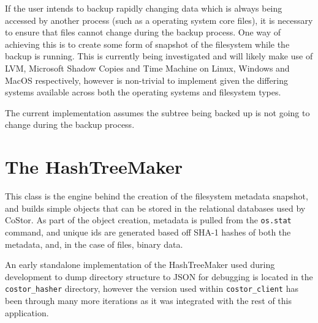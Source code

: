\documentclass[bsc,frontabs,twoside,singlespacing,parskip,deptreport]{infthesis}     %
\begin{document}
If the user intends to backup rapidly changing data which is always being accessed by another 
process (such as a operating system core files), it is necessary to ensure that files 
cannot change during the backup process. One way of achieving this is to create some form
of snapshot of the filesystem while the backup is running. This is currently being investigated
and will likely make use of LVM, Microsoft Shadow Copies and Time Machine on Linux, Windows and
MacOS respectively, however is non-trivial to implement given the differing systems available across
both the operating systems and filesystem types.

The current implementation assumes the subtree being backed up is not going to change during the
backup process.

\clearpage

\section{The HashTreeMaker}

This class is the engine behind the creation of the filesystem metadata snapshot, and builds
simple objects that can be stored in the relational databases used by CoStor. As part of the 
object creation, metadata is pulled from the \texttt{os.stat} command, and unique ids are generated
based off SHA-1 hashes of both the metadata, and, in the case of files, binary data.

An early standalone implementation of the HashTreeMaker used during development to dump directory
structure to JSON for debugging is located in the \texttt{costor\_hasher} directory, however the
version used within \texttt{costor\_client} has been through many more iterations as it was integrated
with the rest of this application.
\end{document}
